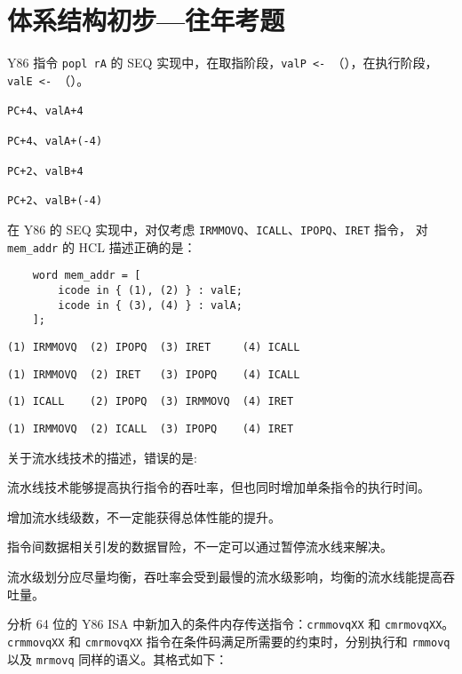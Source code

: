 \chapter{体系结构初步{---}往年考题}
    \begin{problems}
         Y86 指令 \verb|popl rA| 的 SEQ 实现中，在取指阶段，\verb|valP <- |（\quad），在执行阶段，\verb|valE <- |（\quad）。
        \begin{choices}
            \item \verb|PC+4|、\verb|valA+4|
            \item \verb|PC+4|、\verb|valA+(-4)|
            \item \verb|PC+2|、\verb|valB+4|
            \item \verb|PC+2|、\verb|valB+(-4)|
        \end{choices}
         在 Y86 的 SEQ 实现中，对仅考虑 \verb|IRMMOVQ|、\verb|ICALL|、\verb|IPOPQ|、\verb|IRET| 指令， 对 \verb|mem_addr| 的 HCL 描述正确的是：
        \begin{verbatim}
    word mem_addr = [
        icode in { (1), (2) } : valE;
        icode in { (3), (4) } : valA;
    ];
        \end{verbatim}
        \begin{choices}
            \item \verb|(1) IRMMOVQ  (2) IPOPQ  (3) IRET     (4) ICALL|
            \item \verb|(1) IRMMOVQ  (2) IRET   (3) IPOPQ    (4) ICALL|
            \item \verb|(1) ICALL    (2) IPOPQ  (3) IRMMOVQ  (4) IRET|
            \item \verb|(1) IRMMOVQ  (2) ICALL  (3) IPOPQ    (4) IRET|
        \end{choices}
         关于流水线技术的描述，错误的是: 
        \begin{choices}
            \item 流水线技术能够提高执行指令的吞吐率，但也同时增加单条指令的执行时间。
            \item 增加流水线级数，不一定能获得总体性能的提升。
            \item 指令间数据相关引发的数据冒险，不一定可以通过暂停流水线来解决。
            \item 流水级划分应尽量均衡，吞吐率会受到最慢的流水级影响，均衡的流水线能提高吞吐量。
        \end{choices}
         分析 64 位的 Y86 ISA 中新加入的条件内存传送指令：\verb|crmmovqXX| 和 \verb|cmrmovqXX|。\verb|crmmovqXX| 和 \verb|cmrmovqXX| 指令在条件码满足所需要的约束时，分别执行和 \verb|rmmovq| 以及 \verb|mrmovq| 同样的语义。其格式如下：

\end{problems}
